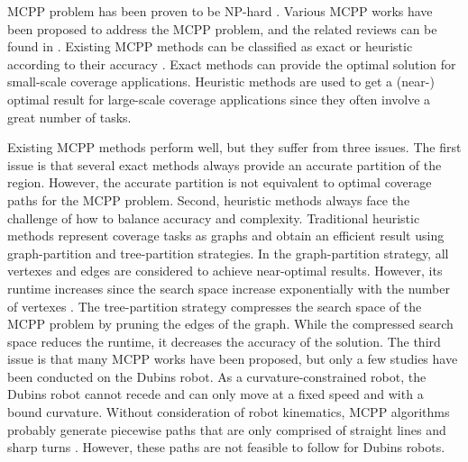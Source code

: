 \documentclass[journal,article,submit,pdftex,moreauthors]{Definitions/mdpi}
\begin{document}

 MCPP problem has been proven to be NP-hard \cite{rekleitis2008efficient}. Various MCPP works have been proposed to address the MCPP problem, and the related reviews can be found in \cite{c29}\cite{c30}\cite{c31}. Existing MCPP methods can be classified as exact or heuristic according to their accuracy \cite{yu2020balanced}. Exact methods can provide the optimal solution for small-scale coverage applications. Heuristic methods are used to get a (near-) optimal result for large-scale coverage applications since they often involve a great number of tasks.

Existing MCPP methods perform well, but they suffer from three issues. The first issue is that several exact methods always provide an accurate partition of the region. However, the accurate partition is not equivalent to optimal coverage paths for the MCPP problem. Second, heuristic methods always face the challenge of how to balance accuracy and complexity. Traditional heuristic methods represent coverage tasks as graphs and obtain an efficient result using graph-partition and tree-partition strategies. In the graph-partition strategy, all vertexes and edges are considered to achieve near-optimal results. However, its runtime increases since the search space increase exponentially with the number of vertexes \cite{yu2020balanced}. The tree-partition strategy compresses the search space of the MCPP problem by pruning the edges of the graph. While the compressed search space reduces the runtime, it decreases the accuracy of the solution. The third issue is that many MCPP works have been proposed, but only a few studies have been conducted on the Dubins robot. As a curvature-constrained robot, the Dubins robot cannot recede and can only move at a fixed speed and with a bound curvature. Without consideration of robot kinematics, MCPP algorithms probably generate piecewise paths that are only comprised of straight lines and sharp turns \cite{khan2017complete}. However, these paths are not feasible to follow for Dubins robots.
\end{document}
